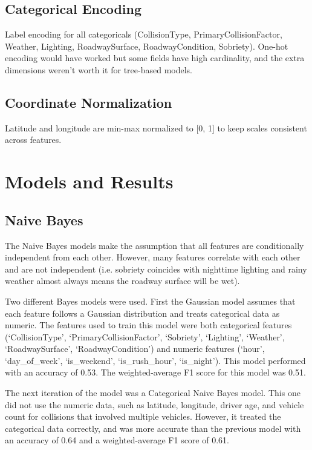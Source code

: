 \documentclass[conference]{IEEEtran}
\begin{document}
\subsection{Categorical Encoding}

Label encoding for all categoricals (CollisionType, PrimaryCollisionFactor, Weather, Lighting, RoadwaySurface, RoadwayCondition, Sobriety). One-hot encoding would have worked but some fields have high cardinality, and the extra dimensions weren't worth it for tree-based models.

\subsection{Coordinate Normalization}

Latitude and longitude are min-max normalized to [0, 1] to keep scales consistent across features.

\section{Models and Results}

\subsection{Naive Bayes}

The Naive Bayes models make the assumption that all features are conditionally independent from each other. However, many features correlate with each other and are not independent (i.e. sobriety coincides with nighttime lighting and rainy weather almost always means the roadway surface will be wet).

Two different Bayes models were used. First the Gaussian model assumes that each feature follows a Gaussian distribution and treats categorical data as numeric. The features used to train this model were both categorical features (`CollisionType', `PrimaryCollisionFactor', `Sobriety', `Lighting', `Weather', `RoadwaySurface', `RoadwayCondition') and numeric features (`hour', `day\_of\_week', `is\_weekend', `is\_rush\_hour', `is\_night'). This model performed with an accuracy of 0.53. The weighted-average F1 score for this model was 0.51.

The next iteration of the model was a Categorical Naive Bayes model. This one did not use the numeric data, such as latitude, longitude, driver age, and vehicle count for collisions that involved multiple vehicles. However, it treated the categorical data correctly, and was more accurate than the previous model with an accuracy of 0.64 and a weighted-average F1 score of 0.61.
\end{document}
